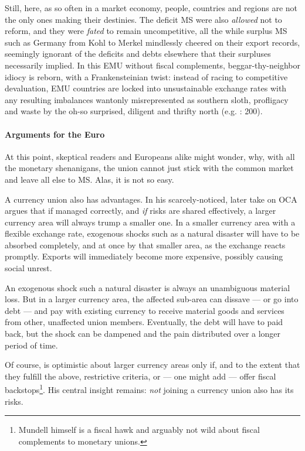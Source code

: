 \documentclass[11pt,a4paper,oneside,openright]{article}
\begin{document}
Still, here, as so often in a market economy, people, countries and regions are not the only ones making their destinies. The deficit \gls{MS} were also \emph{allowed} not to reform, and they were \emph{fated} to remain uncompetitive, all the while surplus \gls{MS} such as Germany from Kohl to Merkel mindlessly cheered on their export records, seemingly ignorant of the deficits and debts elsewhere that their surpluses necessarily implied. In this \gls{EMU} without fiscal complements, beggar-thy-neighbor idiocy is reborn, with a Frankensteinian twist: instead of racing to competitive devaluation, \gls{EMU} countries are locked into unsustainable exchange rates with any resulting imbalances wantonly misrepresented as southern sloth, profligacy and waste by the oh-so surprised, diligent and thrifty north (e.g. \citealt{Featherstone2011}: 200).


\paragraph{Arguments for the Euro} At this point, skeptical readers and Europeans alike might wonder, why, with all the monetary shenanigans, the union cannot just stick with the common market and leave all else to \gls{MS}. Alas, it is not so easy.

A currency union also has advantages. In his scarcely-noticed, later take on \gls{OCA} \cite{Mundell1972} argues that if managed correctly, and \emph{if} risks are shared effectively, a larger currency area will always trump a smaller one. In a smaller currency area with a flexible exchange rate, exogenous shocks such as a natural disaster will have to be absorbed completely, and at once by that smaller area, as the exchange reacts promptly. Exports will immediately become more expensive, possibly causing social unrest.

An exogenous shock such a natural disaster is always an unambiguous material loss. But in a larger currency area, the affected sub-area can dissave --- or go into debt --- and pay with existing currency to receive material goods and services from other, unaffected union members. Eventually, the debt will have to paid back, but the shock can be dampened and the pain distributed over a longer period of time.

Of course, \cite{Mundell1972} is optimistic about larger currency areas only if, and to the extent that they fulfill the above, restrictive criteria, or --- one might add --- offer fiscal backstops\footnote{
	Mundell himself is a fiscal hawk and arguably not wild about fiscal complements to monetary unions.}.
His central insight remains: \emph{not} joining a currency union also has its risks.
\end{document}
